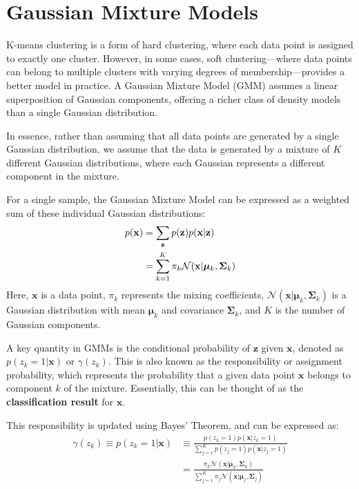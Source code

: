 \section{Gaussian Mixture Models}

K-means clustering is a form of hard clustering, where each data point is assigned to exactly one cluster. However, in some cases, soft clustering—where data points can belong to multiple clusters with varying degrees of membership—provides a better model in practice. A Gaussian Mixture Model (GMM) assumes a linear superposition of Gaussian components, offering a richer class of density models than a single Gaussian distribution.

In essence, rather than assuming that all data points are generated by a single Gaussian distribution, we assume that the data is generated by a mixture of \( K \) different Gaussian distributions, where each Gaussian represents a different component in the mixture.

For a single sample, the Gaussian Mixture Model can be expressed as a weighted sum of these individual Gaussian distributions:
\begin{align*}
	p(\mathbf{x}) &= \sum_{\mathbf{z}} p({\mathbf{z}})p({\mathbf{x}}|{\mathbf{z}}) \\ 
				  &= \sum_{k=1}^{K} \pi_k \mathcal{N}(\mathbf{x} | \boldsymbol{\mu}_k, \boldsymbol{\Sigma}_k)
\end{align*}
Here, \( \mathbf{x} \) is a data point, \( \pi_k \) represents the mixing coefficients, \( \mathcal{N}(\mathbf{x} | \boldsymbol{\mu}_k, \boldsymbol{\Sigma}_k) \) is a Gaussian distribution with mean \( \boldsymbol{\mu}_k \) and covariance \( \boldsymbol{\Sigma}_k \), and \( K \) is the number of Gaussian components.

A key quantity in GMMs is the conditional probability of \( \mathbf{z} \) given \( \mathbf{x} \), denoted as \( p(z_k = 1 | \mathbf{x}) \) or \( \gamma(z_k) \). This is also known as the responsibility or assignment probability, which represents the probability that a given data point \( \mathbf{x} \) belongs to component \( k \) of the mixture. Essentially, this can be thought of as the \textbf{classification result} for \( \mathbf{x} \).

This responsibility is updated using Bayes' Theorem, and can be expressed as:
\begin{align*}
\gamma(z_k) \equiv p(z_k=1|\mathbf{x}) & \equiv \frac{p(z_k=1)p(\mathbf{x}|z_k=1)}{\sum_{j=1}^{K}p(z_j=1)p(\mathbf{x}|z_j=1)} \\
& = \frac{\pi_k\mathcal{N}(\mathbf{x}|\boldsymbol{\mu}_k, \boldsymbol{\Sigma}_k)}{\sum_{j=1}^{K} \pi_j\mathcal{N}(\mathbf{x}|\boldsymbol{\mu}_j, \boldsymbol{\Sigma}_j)}
\end{align*}


